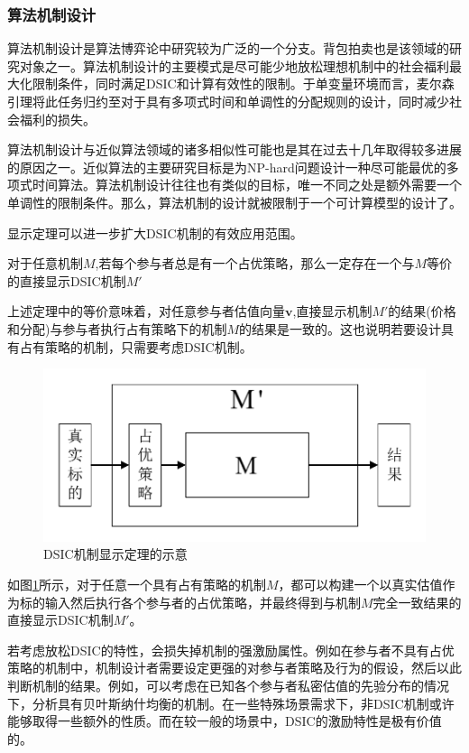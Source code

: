 \documentclass[promaster]{thesis-uestc}
\begin{document}
\subsubsection{算法机制设计}
算法机制设计是算法博弈论中研究较为广泛的一个分支。背包拍卖也是该领域的研究对象之一。算法机制设计的主要模式是尽可能少地放松理想机制中的社会福利最大化限制条件，同时满足DSIC和计算有效性的限制。于单变量环境而言，麦尔森引理将此任务归约至对于具有多项式时间和单调性的分配规则的设计，同时减少社会福利的损失。

算法机制设计与近似算法领域的诸多相似性可能也是其在过去十几年取得较多进展的原因之一。近似算法的主要研究目标是为NP-hard问题设计一种尽可能最优的多项式时间算法。算法机制设计往往也有类似的目标，唯一不同之处是额外需要一个单调性的限制条件。那么，算法机制的设计就被限制于一个可计算模型的设计了。

显示定理可以进一步扩大DSIC机制的有效应用范围。
\begin{theorem}[DSIC机制的显示定理]
对于任意机制$M$,若每个参与者总是有一个占优策略，那么一定存在一个与$M$等价的直接显示DSIC机制$M'$
\end{theorem}

上述定理中的等价意味着，对任意参与者估值向量$\mathbf{v}$,直接显示机制$M'$的结果(价格和分配)与参与者执行占有策略下的机制$M$的结果是一致的。这也说明若要设计具有占有策略的机制，只需要考虑DSIC机制。

\begin{figure}[h]
    \includegraphics[width=350pt]{pic/revelation.pdf}
    \caption{DSIC机制显示定理的示意}
    \label{revelation}
\end{figure}
如图\ref{revelation}所示，对于任意一个具有占有策略的机制$M$，都可以构建一个以真实估值作为标的输入然后执行各个参与者的占优策略，并最终得到与机制$M$完全一致结果的直接显示DSIC机制$M'$。

若考虑放松DSIC的特性，会损失掉机制的强激励属性。例如在参与者不具有占优策略的机制中，机制设计者需要设定更强的对参与者策略及行为的假设，然后以此判断机制的结果。例如，可以考虑在已知各个参与者私密估值的先验分布的情况下，分析具有贝叶斯纳什均衡的机制。在一些特殊场景需求下，非DSIC机制或许能够取得一些额外的性质。而在较一般的场景中，DSIC的激励特性是极有价值的。
\end{document}

